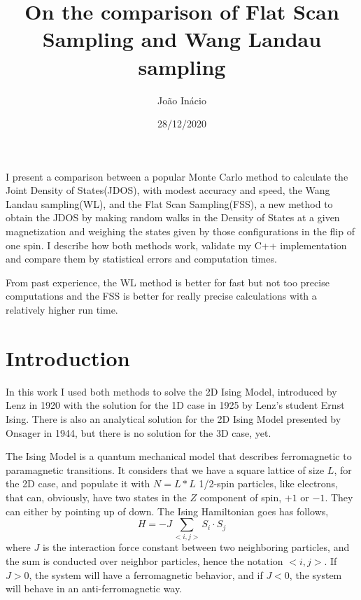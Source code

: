 \documentclass[a4paper, 11pt]{article}
\begin{document}
	\title{\textbf{On the comparison of Flat Scan Sampling and Wang Landau sampling}}
	\author{João Inácio}
	\date{28/12/2020}
	
	\maketitle
	
	
	I present a comparison between a popular Monte Carlo method to  calculate the Joint Density of States(JDOS), with modest accuracy and speed, the Wang Landau sampling(WL), and the Flat Scan Sampling(FSS), a new method to obtain the JDOS by making random walks in the Density of States at a given magnetization and weighing the states given by those configurations in the flip of one spin. I describe how both methods work, validate my C++ implementation and compare them by statistical errors and computation times.
	
	From past experience, the WL method is better for fast but not too precise computations and the FSS is better for really precise calculations with a relatively higher run time.
	
	\section{Introduction}
	
	In this work I used both methods to solve the 2D Ising Model, introduced by Lenz in 1920 with the solution for the 1D case in 1925 by Lenz's student Ernst Ising. There is also an analytical solution for the 2D Ising Model presented by Onsager in 1944, but there is no solution for the 3D case, yet. 
	
	The Ising Model is a quantum mechanical model that describes ferromagnetic to paramagnetic transitions. It considers that we have a square lattice of size $L$, for the 2D case, and populate it with $N = L * L$ 1/2-spin particles, like electrons, that can, obviously, have two states in the $Z$ component of spin, $+1$ or $-1$. They can either by pointing up of down. The Ising Hamiltonian goes has follows,
	\begin{equation*}
		H=-J\sum_{<i,j>}S_i \cdot S_j
	\end{equation*}
	where $J$ is the interaction force constant between two neighboring particles, and the sum is conducted over neighbor particles, hence the notation $<i,j>$. If $J>0$, the system will have a ferromagnetic behavior, and if $J<0$, the system will behave in an anti-ferromagnetic way.
	
\end{document}
